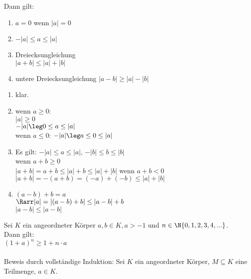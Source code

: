	Dann gilt:
	\begin{enumerate}
	\item{$a = 0$ wenn $|a| = 0$}
	\item{$-|a| \leq a \leq |a|$}
	\item{Dreiecksungleichung\\
	$|a + b| \leq |a| + |b|$}
	\item{untere Dreiecksungleichung
	$|a - b| \geq |a| - |b|$} %
	\end{enumerate}
\bew
	\begin{enumerate}
	\item{klar.}
	\item{wenn $a \geq 0$:\\
	$|a| \geq 0$\\
	\Rarr $ -|a| \leg 0 \leq a \leq |a|$\\
	wenn $a \leq 0$:
	$-|a| \leg a \leq 0 \leq |a|$}
	\item{Es gilt: $-|a| \leq a \leq |a|$, $-|b| \leq b \leq |b|$\\
	wenn $a + b \geq 0$\\
	$|a + b| = a + b \leq |a| + b \leq |a| + |b|$
	wenn $a + b < 0$\\
	$|a + b| = -(a + b) = (-a) + (-b) \leq |a| + |b|$}
	\item{$(a - b) + b = a$\\
	$\Rarr |a| = |(a - b) + b| \leq |a - b| + b$\\
	$|a - b| \leq |a - b|$} %
	\end{enumerate}
	Sei $K$ ein angeordneter Körper $a, b \in K, a > -1$ und $n \in \N \{0, 1, 2, 3, 4, ...\}$.\\
	Dann gilt:\\
	$(1 + a)^n \geq 1 + n \cdot a$\\
	\\
	Beweis durch vollständige Induktion:
	Sei $K$ ein angeordneter Körper, $M \subseteq K$ eine Teilmenge, $a \in K$.\\
